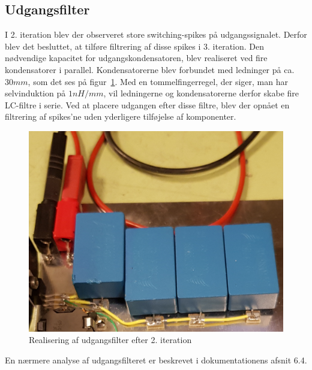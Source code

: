 
\subsection{Udgangsfilter}
I 2. iteration blev der observeret store switching-spikes på udgangssignalet. Derfor blev det besluttet, at tilføre filtrering af disse spikes i 3. iteration. Den nødvendige kapacitet for udgangskondensatoren, blev realiseret ved fire kondensatorer i parallel. Kondensatorerne blev forbundet med ledninger på ca. $30mm$, som det ses på figur~\ref{fig:udgangsfilter}. Med en tommelfingerregel, der siger, man har selvinduktion på $1nH/mm$\cite{rule_of_thumb}, vil ledningerne og kondensatorerne derfor skabe fire LC-filtre i serie. Ved at placere udgangen efter disse filtre, blev der opnået en filtrering af spikes'ne uden yderligere tilføjelse af komponenter. 

\begin{figure}[H]
	\centering
	\includegraphics[width=0.5\linewidth]{../Dokumentation/tex/3iteration/Billeder/Analyse/Udgangsfilter_2iteration.png}
	\caption{Realisering af udgangsfilter efter 2. iteration}
	\label{fig:udgangsfilter}
\end{figure}

\noindent En nærmere analyse af udgangsfilteret er beskrevet i dokumentationens afsnit 6.4.